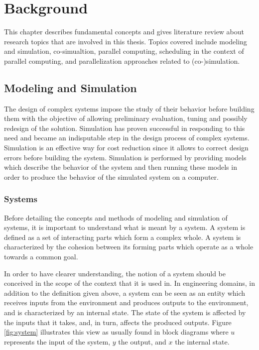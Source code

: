 \chapter{\label{ch:2-bkgnd}Background}

\minitoc

This chapter describes fundamental concepts and gives literature review about research topics that are involved in this thesis. Topics covered include modeling and simulation, co-simualtion, parallel computing, scheduling in the context of parallel computing, and parallelization approaches related to (co-)simulation. 

\section{Modeling and Simulation}

The design of complex systems impose the study of their behavior before building them with the objective of allowing preliminary evaluation, tuning and possibly redesign of the solution. Simulation has proven successful in responding to this need and became an indisputable step in the design process of complex systems. Simulation is an effective way for cost reduction since it allows to correct design errors before building the system. Simulation is performed by providing models which describe the behavior of the system and then running these models in order to produce the behavior of the simulated system on a computer.   

\subsection{Systems}

Before detailing the concepts and methods of modeling and simulation of systems, it is important to understand what is meant by a system. A system is defined as a set of interacting parts which form a complex whole. A system is characterized by the cohesion between its forming parts which operate as a whole towards a common goal. 

In order to have clearer understanding, the notion of a system should be conceived in the scope of the context that it is used in. In engineering domains, in addition to the definition given above, a system can be seen as an entity which receives inputs from the environment and produces outputs to the environment, and is characterized by an internal state. The state of the system is affected by the inputs that it takes, and, in turn, affects the produced outputs. Figure \ref{fig:system} illustrates this view as usually found in block diagrams where $u$ represents the input of the system, $y$ the output, and $x$ the internal state.

